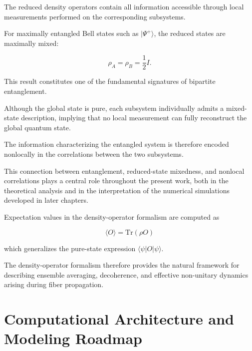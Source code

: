 \medskip

The reduced density operators contain all information accessible through local measurements performed on the corresponding subsystems.

\medskip

For maximally entangled Bell states such as \( |\Psi^+\rangle \), the reduced states are maximally mixed:

\begin{equation}
\rho_A
=
\rho_B
=
\frac{1}{2} I.
\label{eq:maximally_mixed_reduced_states}
\end{equation}

This result constitutes one of the fundamental signatures of bipartite entanglement.

Although the global state is pure, each subsystem individually admits a mixed-state description, implying that no local measurement can fully reconstruct the global quantum state.

The information characterizing the entangled system is therefore encoded nonlocally in the correlations between the two subsystems.

\medskip

This connection between entanglement, reduced-state mixedness, and nonlocal correlations plays a central role throughout the present work, both in the theoretical analysis and in the interpretation of the numerical simulations developed in later chapters.
\medskip

Expectation values in the density-operator formalism are computed as

\begin{equation}
\langle O \rangle = \mathrm{Tr}(\rho O)
\label{eq:density_expectation}
\end{equation}

which generalizes the pure-state expression \( \langle \psi | O | \psi \rangle \).

\medskip

The density-operator formalism therefore provides the natural framework for describing ensemble averaging, decoherence, and effective non-unitary dynamics arising during fiber propagation.


\section{Computational Architecture and Modeling Roadmap}

